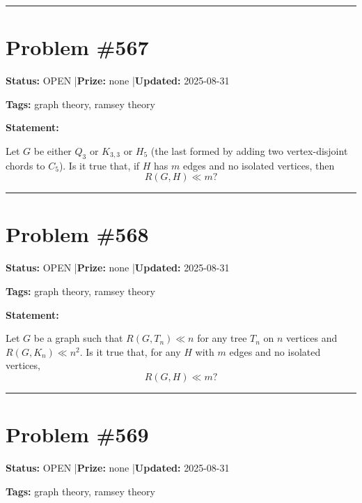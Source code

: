 \documentclass{article}
\begin{document}
\noindent\rule{\linewidth}{0.4pt}


\section{Problem \#567}
\label{prob:567}

\noindent\textbf{Status:} OPEN \quad|\quad \textbf{Prize:} none \quad|\quad \textbf{Updated:} 2025-08-31

\noindent\textbf{Tags:} graph theory, ramsey theory

\medskip

\noindent\textbf{Statement:}

Let $G$ be either $Q_3$ or $K_{3,3}$ or $H_5$ (the last formed by adding two vertex-disjoint chords to $C_5$). Is it true that, if $H$ has $m$ edges and no isolated vertices, then\[R(G,H)\ll m?\]

\noindent\rule{\linewidth}{0.4pt}


\section{Problem \#568}
\label{prob:568}

\noindent\textbf{Status:} OPEN \quad|\quad \textbf{Prize:} none \quad|\quad \textbf{Updated:} 2025-08-31

\noindent\textbf{Tags:} graph theory, ramsey theory

\medskip

\noindent\textbf{Statement:}

Let $G$ be a graph such that $R(G,T_n)\ll n$ for any tree $T_n$ on $n$ vertices and $R(G,K_n)\ll n^2$. Is it true that, for any $H$ with $m$ edges and no isolated vertices,\[R(G,H)\ll m?\]

\noindent\rule{\linewidth}{0.4pt}


\section{Problem \#569}
\label{prob:569}

\noindent\textbf{Status:} OPEN \quad|\quad \textbf{Prize:} none \quad|\quad \textbf{Updated:} 2025-08-31

\noindent\textbf{Tags:} graph theory, ramsey theory

\medskip
\end{document}
